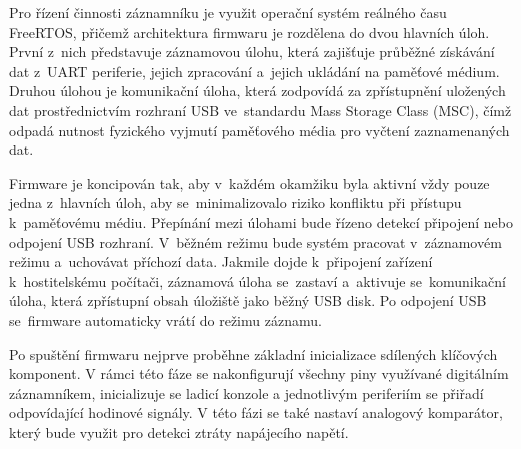 Pro řízení činnosti záznamníku je využit operační systém reálného času FreeRTOS, přičemž architektura firmwaru je rozdělena do dvou hlavních úloh. První z~nich představuje záznamovou úlohu, která zajišťuje průběžné získávání dat z~UART periferie, jejich zpracování a~jejich ukládání na paměťové médium. Druhou úlohou je komunikační úloha, která zodpovídá za zpřístupnění uložených dat prostřednictvím rozhraní USB ve~standardu Mass Storage Class (MSC), čímž odpadá nutnost fyzického vyjmutí paměťového média pro vyčtení zaznamenaných dat. 



Firmware je koncipován tak, aby v~každém okamžiku byla aktivní vždy pouze jedna z~hlavních úloh, aby se~minimalizovalo riziko konfliktu při přístupu k~paměťovému médiu. Přepínání mezi úlohami bude řízeno detekcí připojení nebo odpojení USB rozhraní. V~běžném režimu bude systém pracovat v~záznamovém režimu a~uchovávat příchozí data. Jakmile dojde k~připojení zařízení k~hostitelskému počítači, záznamová úloha se~zastaví a~aktivuje se~komunikační úloha, která zpřístupní obsah úložiště jako běžný USB disk. Po odpojení USB se~firmware automaticky vrátí do režimu záznamu.

Po spuštění firmwaru nejprve proběhne základní inicializace sdílených klíčových komponent. V rámci této fáze se nakonfigurují všechny piny využívané digitálním záznamníkem, inicializuje se ladicí konzole a jednotlivým periferiím se přiřadí odpovídající hodinové signály. V této fázi se také nastaví analogový komparátor, který bude využit pro detekci ztráty napájecího napětí.


